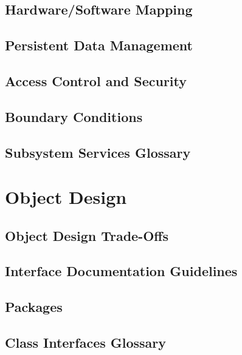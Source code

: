 \documentclass[a4paper,12pt]{report}
\begin{document}
		\section{Hardware/Software Mapping}
		\section{Persistent Data Management}
		\section{Access Control and Security}
		\section{Boundary Conditions}
		\section{Subsystem Services Glossary}
	\chapter{Object Design}
		\section{Object Design Trade-Offs}
		\section{Interface Documentation Guidelines}
		\section{Packages}
		\section{Class Interfaces Glossary}
\end{document}
